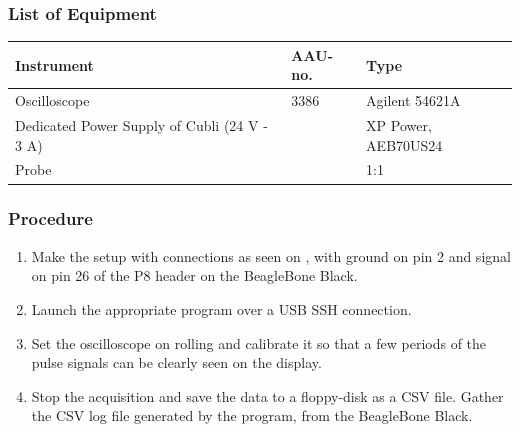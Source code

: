 \subsubsection{List of Equipment}
\begin{table}[H]
  \begin{tabular}{|l|l|p{4.3cm}|}
    \hline%
    \textbf{Instrument}                                   &  \textbf{AAU-no.} &  \textbf{Type}            \\
    \hline%
    Oscilloscope                                          &  3386             &  Agilent 54621A           \\
    \hline%
    Dedicated Power Supply of Cubli \small{(24 V - 3 A)}  &                   &  XP Power, AEB70US24      \\
    \hline%
    Probe                                                 &                   &  1:1                      \\
    \hline%
  \end{tabular}
\end{table}

\subsubsection{Procedure}
\begin{enumerate}
  \item Make the setup with connections as seen on , with ground on pin 2 and signal on pin 26 of the P8 header on the BeagleBone Black.
  \item Launch the appropriate program over a USB SSH connection.
  \item Set the oscilloscope on rolling and calibrate it so that a few periods of the pulse signals can be clearly seen on the display.
  \item Stop the acquisition and save the data to a floppy-disk as a CSV file. Gather the CSV log file generated by the program, from the BeagleBone Black.
\end{enumerate}

